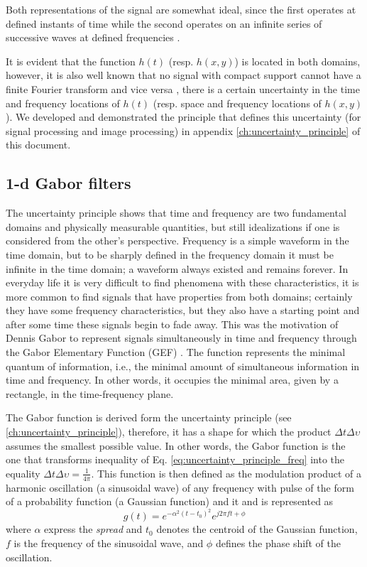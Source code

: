 Both representations of the signal are somewhat ideal, since the first operates at defined instants of time while the second operates on an infinite series of successive waves at defined frequencies \citep{Gabor:JIEE:1946}. 

It is evident that the function $h(t)$ (resp. $h(x, y)$) is located in both domains, however, it is also well known that no signal with compact support cannot have a finite Fourier transform and vice versa \citep{Bracewell:FourierBook:1999}, there is a certain uncertainty in the time and frequency locations of $h(t)$ (resp. space and frequency locations of $h(x, y)$). We developed and demonstrated the principle that defines this uncertainty (for signal processing and image processing) in appendix \ref{ch:uncertainty_principle} of this document.

\subsection{1-d Gabor filters}
The uncertainty principle shows that time and frequency are two fundamental domains and physically measurable quantities, but still idealizations if one is considered from the other's perspective.
Frequency is a simple waveform in the time domain, but to be sharply defined in the frequency domain it must be infinite in the time domain; a waveform always existed and remains forever. In everyday life it is very difficult to find phenomena with these characteristics, it is more common to find signals that have properties from both domains; certainly they have some frequency characteristics, but they also have a starting point and after some time these signals begin to fade away. This was the motivation of Dennis Gabor to represent signals simultaneously in time and frequency through the Gabor Elementary Function (GEF) \citep{Gabor:JIEE:1946}. The function represents the minimal quantum of information, i.e., the minimal amount of simultaneous information in time and frequency. In other words, it occupies the minimal area, given by a rectangle, in the time-frequency plane.  

The Gabor function is derived form the uncertainty principle (see \ref{ch:uncertainty_principle}), therefore, it has a shape for which the product $\Delta t \Delta \upsilon$ assumes the smallest possible value. In other words, the Gabor function is the one that transforms inequality of Eq. \eqref{eq:uncertainty_principle_freq} into the equality $\Delta t \Delta \upsilon = \frac{1}{4 \pi}$. This function is then defined as the modulation product of a harmonic oscillation (a sinusoidal wave) of any frequency with pulse of the form of a probability function (a Gaussian function) \citep{Gabor:JIEE:1946} and it and is represented as
\begin{equation}\label{eq:gabor_function_1d_time}
    g(t) =  e ^{-\alpha^2(t-t_0)^2} e ^{j 2 \pi f t + \phi}
\end{equation}
where $\alpha$ express the \textit{spread} and $t_0$ denotes the centroid of the Gaussian function, $f$ is the frequency of the sinusoidal wave, and $\phi$ defines the phase shift of the oscillation.

